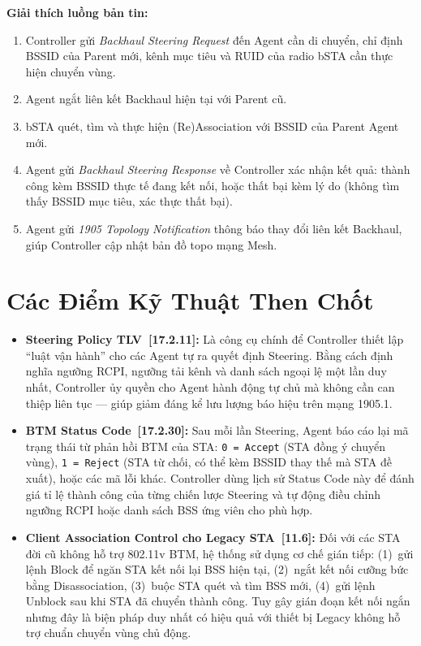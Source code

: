 \textbf{Giải thích luồng bản tin:}
\begin{enumerate}
	\item Controller gửi \textit{Backhaul Steering Request} đến Agent cần di chuyển,
	chỉ định BSSID của Parent mới, kênh mục tiêu và RUID của radio bSTA cần
	thực hiện chuyển vùng.
	\item Agent ngắt liên kết Backhaul hiện tại với Parent cũ.
	\item bSTA quét, tìm và thực hiện (Re)Association với BSSID của Parent Agent mới.
	\item Agent gửi \textit{Backhaul Steering Response} về Controller xác nhận kết quả:
	thành công kèm BSSID thực tế đang kết nối, hoặc thất bại kèm lý do (không
	tìm thấy BSSID mục tiêu, xác thực thất bại).
	\item Agent gửi \textit{1905 Topology Notification} thông báo thay đổi liên kết
	Backhaul, giúp Controller cập nhật bản đồ topo mạng Mesh.
\end{enumerate}


\section{Các Điểm Kỹ Thuật Then Chốt}

\begin{itemize}
	\item \textbf{Steering Policy TLV~[17.2.11]:} Là công cụ chính để Controller
	thiết lập ``luật vận hành'' cho các Agent tự ra quyết định Steering. Bằng
	cách định nghĩa ngưỡng RCPI, ngưỡng tải kênh và danh sách ngoại lệ một lần
	duy nhất, Controller ủy quyền cho Agent hành động tự chủ mà không cần can
	thiệp liên tục --- giúp giảm đáng kể lưu lượng báo hiệu trên mạng 1905.1.
	
	\item \textbf{BTM Status Code~[17.2.30]:} Sau mỗi lần Steering, Agent báo cáo lại
	mã trạng thái từ phản hồi BTM của STA: \texttt{0 = Accept} (STA đồng ý
	chuyển vùng), \texttt{1 = Reject} (STA từ chối, có thể kèm BSSID thay thế
	mà STA đề xuất), hoặc các mã lỗi khác. Controller dùng lịch sử Status Code
	này để đánh giá tỉ lệ thành công của từng chiến lược Steering và tự động
	điều chỉnh ngưỡng RCPI hoặc danh sách BSS ứng viên cho phù hợp.
	
	\item \textbf{Client Association Control cho Legacy STA~[11.6]:} Đối với các STA
	đời cũ không hỗ trợ 802.11v BTM, hệ thống sử dụng cơ chế gián tiếp: (1)~gửi
	lệnh Block để ngăn STA kết nối lại BSS hiện tại, (2)~ngắt kết nối cưỡng bức
	bằng Disassociation, (3)~buộc STA quét và tìm BSS mới, (4)~gửi lệnh Unblock
	sau khi STA đã chuyển thành công. Tuy gây gián đoạn kết nối ngắn nhưng đây
	là biện pháp duy nhất có hiệu quả với thiết bị Legacy không hỗ trợ chuẩn
	chuyển vùng chủ động.
\end{itemize}